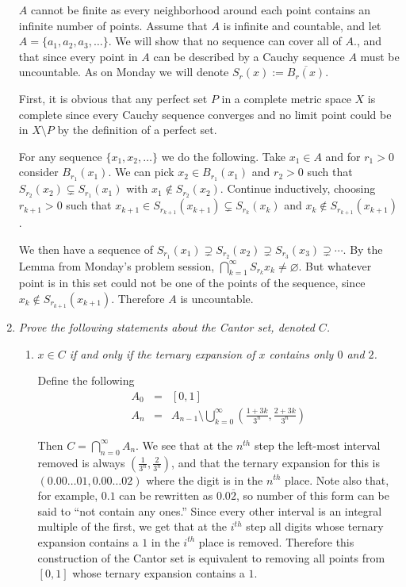 \documentclass[11pt]{article}
\begin{document}
\begin{enumerate}
$A$ cannot be finite as every neighborhood around each point contains an infinite number of points.  Assume that $A$ is infinite and countable, and let $A = \{a_1,a_2,a_3,\ldots\}$.  We will show that no sequence can cover all of $A.$, and that since every point in $A$ can be described by a Cauchy sequence $A$ must be uncountable.  As on Monday we will denote $S_r(x) := \overline{B_r(x)}$.

First, it is obvious that any perfect set $P$ in a complete metric space $X$ is complete since every Cauchy sequence converges and no limit point could be in $X \setminus P$ by the definition of a perfect set.

For any sequence $\{x_1, x_2, \ldots\}$ we do the following.  Take $x_1 \in A$ and for $r_1 > 0$ consider $B_{r_1}(x_1)$.  We can pick $x_2 \in  B_{r_1}(x_1)$ and $r_2 > 0$ such that $S_{r_2}(x_2) \subsetneq S_{r_1}(x_1)$ with $x_1 \notin S_{r_2}(x_2)$. Continue inductively, choosing $r_{k+1} > 0$ such that $x_{k+1} \in S_{r_{k+1}}(x_{k+1}) \subsetneq S_{r_k}(x_k)$ and $x_k \notin S_{r_{k+1}}(x_{k+1})$.

We then have a sequence of $S_{r_1}(x_1) \supsetneq S_{r_2}(x_2) \supsetneq S_{r_3}(x_3) \supsetneq \cdots$.  By the Lemma from Monday's problem session, $\bigcap_{k=1}^\infty S_{r_k}{x_k} \neq \varnothing$.  But whatever point is in this set could not be one of the points of the sequence, since $x_k \notin S_{r_{k+1}}(x_{k+1})$.  Therefore $A$ is uncountable.

\item \emph{Prove the following statements about the Cantor set, denoted $C$.}
\begin{enumerate}
\item \emph{$x \in C$ if and only if the ternary expansion of $x$ contains only $0$ and $2$.}

Define the following
\begin{eqnarray}
A_0 &=& [0,1] \\
A_n &=& A_{n-1} \setminus \bigcup_{k=0}^\infty \left( \frac{1+3k}{3^n},\frac{2+3k}{3^n} \right)
\end{eqnarray}

Then $C = \bigcap_{n=0}^\infty A_n$.
We see that at the $n^{th}$ step the left-most interval removed is always $\left(\frac{1}{3^n},\frac{2}{3^n}\right)$, and that the ternary expansion for this is $\left(0.00 \ldots 01, 0.00 \ldots 02\right)$ where the digit is in the $n^{th}$ place.  Note also that, for example, $0.1$ can be rewritten as $0.0\overline{2}$, so number of this form can be said to ``not contain any ones.''  Since every other interval is an integral multiple of the first, we get that at the $i^{th}$ step all digits whose ternary expansion contains a $1$ in the $i^{th}$ place is removed.  Therefore this construction of the Cantor set is equivalent to removing all points from $[0,1]$ whose ternary expansion contains a $1$.


\end{enumerate}
\end{enumerate}
\end{document}
